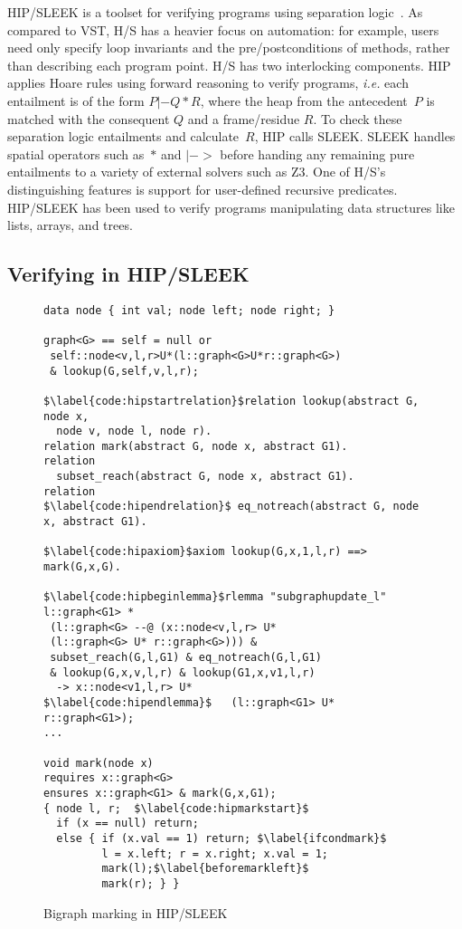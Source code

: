HIP/SLEEK is a toolset for verifying programs using separation logic~\cite{chin:hipsleek}.  As compared to VST, H/S has a heavier focus on automation: for example, users need only specify loop invariants and the pre/postconditions of methods, rather than describing each program point.  H/S has two interlocking components.  HIP applies Hoare rules using forward reasoning to verify programs, \emph{i.e.} each entailment is of the form $P |- Q * R$, where the heap from the antecedent~$P$ is matched with the consequent $Q$ and a frame/residue $R$. To check these separation logic entailments and calculate~$R$, HIP calls SLEEK.  SLEEK handles spatial operators such as~$*$ and $|->$ before handing any remaining pure entailments to a variety of external solvers such as Z3.  One of H/S's distinguishing features is support for user-defined recursive predicates.  HIP/SLEEK has been used to verify programs manipulating data structures like lists, arrays, and trees.

\subsection{Verifying  in HIP/SLEEK}
\label{sec:hipsleekmark}

\begin{figure}[t]
  \begin{lstlisting}
data node { int val; node left; node right; }

graph<G> == self = null or 
 self::node<v,l,r>U*(l::graph<G>U*r::graph<G>)
 & lookup(G,self,v,l,r);

$\label{code:hipstartrelation}$relation lookup(abstract G, node x, 
  node v, node l, node r).
relation mark(abstract G, node x, abstract G1).
relation
  subset_reach(abstract G, node x, abstract G1).
relation
$\label{code:hipendrelation}$ eq_notreach(abstract G, node x, abstract G1).

$\label{code:hipaxiom}$axiom lookup(G,x,1,l,r) ==> mark(G,x,G).

$\label{code:hipbeginlemma}$rlemma "subgraphupdate_l" l::graph<G1> *
 (l::graph<G> --@ (x::node<v,l,r> U*
 (l::graph<G> U* r::graph<G>))) &
 subset_reach(G,l,G1) & eq_notreach(G,l,G1)
 & lookup(G,x,v,l,r) & lookup(G1,x,v1,l,r)
  -> x::node<v1,l,r> U*
$\label{code:hipendlemma}$   (l::graph<G1> U* r::graph<G1>);
...

void mark(node x) 
requires x::graph<G>
ensures x::graph<G1> & mark(G,x,G1);
{ node l, r;  $\label{code:hipmarkstart}$ 
  if (x == null) return;
  else { if (x.val == 1) return; $\label{ifcondmark}$
         l = x.left; r = x.right; x.val = 1;
         mark(l);$\label{beforemarkleft}$
         mark(r); } } 
\end{lstlisting}
\caption{Bigraph marking in HIP/SLEEK}
\label{fig:hipmarkgraph}
\end{figure}

